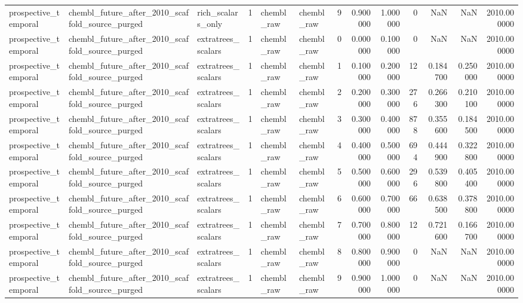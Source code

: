 \begin{longtable}{lllrllrrrrrrr}
prospective\_temporal & chembl\_future\_after\_2010\_scaffold\_source\_purged & rich\_scalars\_only & 1 & chembl\_raw & chembl\_raw & 9 & 0.900000 & 1.000000 & 0 & NaN & NaN & 2010.000000 \\
prospective\_temporal & chembl\_future\_after\_2010\_scaffold\_source\_purged & extratrees\_scalars & 1 & chembl\_raw & chembl\_raw & 0 & 0.000000 & 0.100000 & 0 & NaN & NaN & 2010.000000 \\
prospective\_temporal & chembl\_future\_after\_2010\_scaffold\_source\_purged & extratrees\_scalars & 1 & chembl\_raw & chembl\_raw & 1 & 0.100000 & 0.200000 & 12 & 0.184700 & 0.250000 & 2010.000000 \\
prospective\_temporal & chembl\_future\_after\_2010\_scaffold\_source\_purged & extratrees\_scalars & 1 & chembl\_raw & chembl\_raw & 2 & 0.200000 & 0.300000 & 276 & 0.266300 & 0.210100 & 2010.000000 \\
prospective\_temporal & chembl\_future\_after\_2010\_scaffold\_source\_purged & extratrees\_scalars & 1 & chembl\_raw & chembl\_raw & 3 & 0.300000 & 0.400000 & 878 & 0.355600 & 0.184500 & 2010.000000 \\
prospective\_temporal & chembl\_future\_after\_2010\_scaffold\_source\_purged & extratrees\_scalars & 1 & chembl\_raw & chembl\_raw & 4 & 0.400000 & 0.500000 & 694 & 0.444900 & 0.322800 & 2010.000000 \\
prospective\_temporal & chembl\_future\_after\_2010\_scaffold\_source\_purged & extratrees\_scalars & 1 & chembl\_raw & chembl\_raw & 5 & 0.500000 & 0.600000 & 296 & 0.539800 & 0.405400 & 2010.000000 \\
prospective\_temporal & chembl\_future\_after\_2010\_scaffold\_source\_purged & extratrees\_scalars & 1 & chembl\_raw & chembl\_raw & 6 & 0.600000 & 0.700000 & 66 & 0.638500 & 0.378800 & 2010.000000 \\
prospective\_temporal & chembl\_future\_after\_2010\_scaffold\_source\_purged & extratrees\_scalars & 1 & chembl\_raw & chembl\_raw & 7 & 0.700000 & 0.800000 & 12 & 0.721600 & 0.166700 & 2010.000000 \\
prospective\_temporal & chembl\_future\_after\_2010\_scaffold\_source\_purged & extratrees\_scalars & 1 & chembl\_raw & chembl\_raw & 8 & 0.800000 & 0.900000 & 0 & NaN & NaN & 2010.000000 \\
prospective\_temporal & chembl\_future\_after\_2010\_scaffold\_source\_purged & extratrees\_scalars & 1 & chembl\_raw & chembl\_raw & 9 & 0.900000 & 1.000000 & 0 & NaN & NaN & 2010.000000 \\

\end{longtable}
